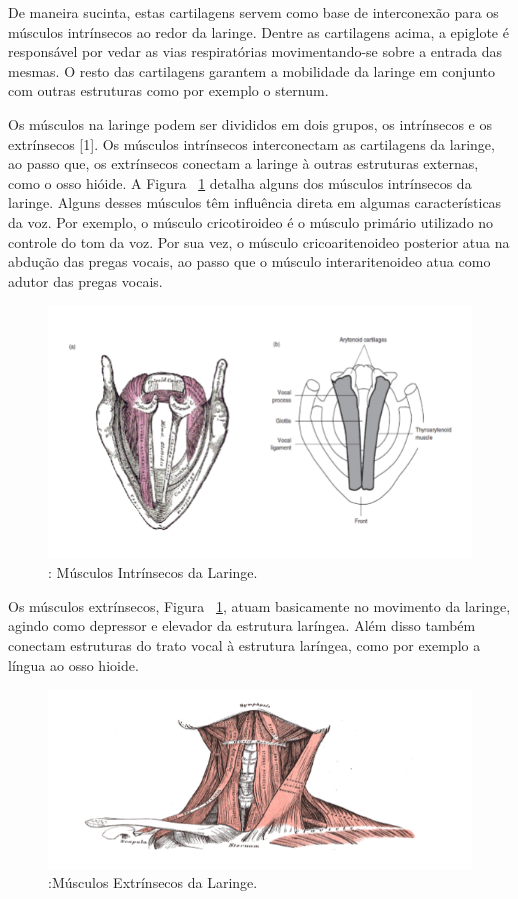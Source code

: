 	De maneira sucinta, estas cartilagens servem como base de interconexão para os músculos intrínsecos ao redor da laringe. Dentre as cartilagens acima, a epiglote é responsável por vedar as vias respiratórias movimentando-se sobre a entrada das mesmas. O resto das cartilagens garantem a mobilidade da laringe em conjunto com outras estruturas como por exemplo o sternum.
	
	Os músculos na laringe podem ser divididos em dois grupos, os intrínsecos e os extrínsecos [1]. Os músculos intrínsecos interconectam as cartilagens da laringe, ao passo que, os extrínsecos conectam a laringe à outras estruturas externas, como o osso hióide. A Figura ~\ref{fig:musculosLaringe} detalha alguns dos músculos intrínsecos da laringe. Alguns desses músculos têm inﬂuência direta em algumas características da voz. Por exemplo, o músculo cricotiroideo é o músculo primário utilizado no controle do tom da voz. Por sua vez, o músculo cricoaritenoideo posterior atua na abdução das pregas vocais, ao passo que o músculo interaritenoideo atua como adutor das pregas vocais.
	
	\begin{figure}
		\centering
		\includegraphics[scale=0.5]{musculosLaringe}
		\caption{: Músculos Intrínsecos da Laringe.~\cite{Bell}}
		\label{fig:musculosLaringe}
	\end{figure}
	
	Os músculos extrínsecos, Figura ~\ref{fig:musculosLaringe}, atuam basicamente no movimento da laringe, agindo como depressor e elevador da estrutura laríngea. Além disso também conectam estruturas do trato vocal à estrutura laríngea, como por exemplo a língua ao osso hioide.
	
	\begin{figure}
		\centering
		\includegraphics[scale=0.5]{musculosPescoco}
		\caption{:Músculos Extrínsecos da Laringe.~\cite{Bell}}
		\label{fig:musculosPescoco}
	\end{figure}	
	
